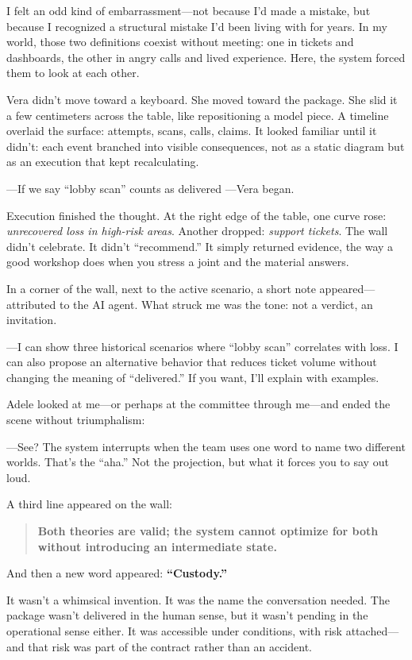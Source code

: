 \documentclass[11pt,a4paper]{article}
\begin{document}
I felt an odd kind of embarrassment---not because I'd made a mistake, but
because I recognized a structural mistake I'd been living with for years. In
my world, those two definitions coexist without meeting: one in tickets and
dashboards, the other in angry calls and lived experience. Here, the system
forced them to look at each other.

Vera didn't move toward a keyboard. She moved toward the package. She slid it
a few centimeters across the table, like repositioning a model piece. A
timeline overlaid the surface: attempts, scans, calls, claims. It looked
familiar until it didn't: each event branched into visible consequences, not
as a static diagram but as an execution that kept recalculating.

---If we say ``lobby scan'' counts as delivered ---Vera began.

Execution finished the thought. At the right edge of the table, one curve
rose: \emph{unrecovered loss in high-risk areas}. Another dropped:
\emph{support tickets}. The wall didn't celebrate. It didn't ``recommend.''
It simply returned evidence, the way a good workshop does when you stress a
joint and the material answers.

In a corner of the wall, next to the active scenario, a short note
appeared---attributed to the AI agent. What struck me was the tone: not a
verdict, an invitation.

---I can show three historical scenarios where ``lobby scan'' correlates with
loss. I can also propose an alternative behavior that reduces ticket volume
without changing the meaning of ``delivered.'' If you want, I'll explain with
examples.

Adele looked at me---or perhaps at the committee through me---and ended the
scene without triumphalism:

---See? The system interrupts when the team uses one word to name two
different worlds. That's the ``aha.'' Not the projection, but what it forces
you to say out loud.

A third line appeared on the wall:

\begin{quote}
\centering
\textbf{Both theories are valid; the system cannot optimize for both without
introducing an intermediate state.}
\end{quote}

And then a new word appeared: \textbf{``Custody.''}

It wasn't a whimsical invention. It was the name the conversation needed. The
package wasn't delivered in the human sense, but it wasn't pending in the
operational sense either. It was accessible under conditions, with risk
attached---and that risk was part of the contract rather than an accident.
\end{document}
